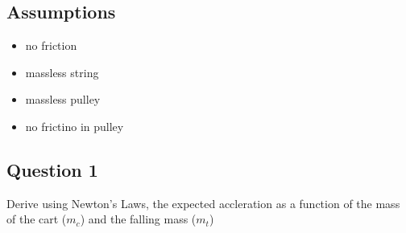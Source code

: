 \documentclass{article}
\begin{document}
\begin{figure}[H]
	\centering
\end{figure}

\subsection{Assumptions}
\begin{itemize}
\item no friction
\item massless string
\item massless pulley
\item no frictino in pulley
\end{itemize}

\pagebreak

\subsection{Question 1}
Derive using Newton's Laws, the expected accleration as a function of the mass of the cart ($m_{c}$) and the falling mass ($m_{t}$)
\end{document}
